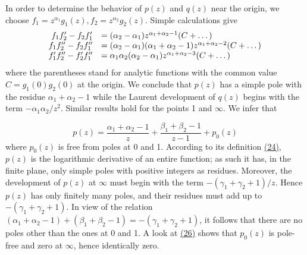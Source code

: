 In order to determine the behavior of $p(z)$ and $q(z)$ near the origin, we choose $f_{1} = z^{\alpha_{1}}g_{1}(z), f_{2} = z^{\alpha_{2}}g_{2}(z)$. Simple calculations give
\begin{equation*}
\begin{array}{r l} f _ {1} f _ {2} ^ {\prime} - f _ {2} f _ {1} ^ {\prime} & = (\alpha_ {2} - \alpha_ {1}) z ^ {\alpha_ {1} + \alpha_ {2} - 1} (C + \dots) \\ f _ {1} f _ {2} ^ {\prime \prime} - f _ {2} f _ {1} ^ {\prime \prime} & = (\alpha_ {2} - \alpha_ {1}) (\alpha_ {1} + \alpha_ {2} - 1) z ^ {\alpha_ {1} + \alpha_ {2} - 2} (C + \dots) \\ f _ {1} ^ {\prime} f _ {2} ^ {\prime \prime} - f _ {2} ^ {\prime} f _ {1} ^ {\prime \prime} & = \alpha_ {1} \alpha_ {2} (\alpha_ {2} - \alpha_ {1}) z ^ {\alpha_ {1} + \alpha_ {2} - 3} (C + \dots) \end{array}
\end{equation*}
where the parentheses stand for analytic functions with the common value $C = g_{1}(0)g_{2}(0)$ at the origin. We conclude that $p(z)$ has a simple pole with the residue $\alpha_{1} + \alpha_{2} - 1$ while the Laurent development of $q(z)$ begins with the term $-\alpha_{1}\alpha_{2}/z^{2}$. Similar results hold for the points 1 and $\infty$. We infer that


\begin{equation*}
p (z) = \frac {\alpha_ {1} + \alpha_ {2} - 1}{z} + \frac {\beta_ {1} + \beta_ {2} - 1}{z - 1} + p _ {0} (z)\tag{26}\label{eq:8.26}
\end{equation*}
where $p_{0}(z)$ is free from poles at 0 and 1. According to its definition \hyperref[eq:8.24]{(24)}, $p(z)$ is the logarithmic derivative of an entire function; as such it has, in the finite plane, only simple poles with positive integers as residues. Moreover, the development of $p(z)$ at $\infty$ must begin with the term $-(\gamma_{1} + \gamma_{2} + 1)/z$. Hence $p(z)$ has only finitely many poles, and their residues must add up to $-(\gamma_{1} + \gamma_{2} + 1)$. In view of the relation $(\alpha_{1} + \alpha_{2} - 1) + (\beta_{1} + \beta_{2} - 1) = -(\gamma_{1} + \gamma_{2} + 1)$, it follows that there are no poles other than the ones at 0 and 1. A look at \hyperref[eq:8.26]{(26)} shows that $p_{0}(z)$ is pole-free and zero at $\infty$, hence identically zero.

